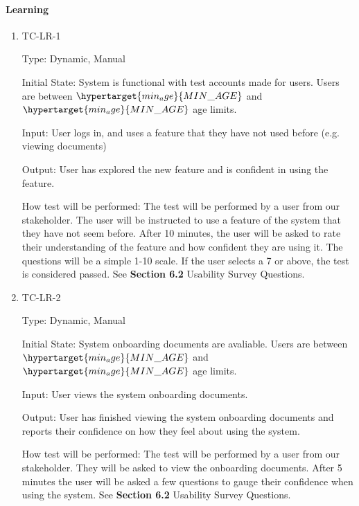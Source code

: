 \documentclass[12pt, titlepage]{article}
\begin{document}
\paragraph{Learning}
\begin{enumerate}
  \item{TC-LR-1\\}

    Type: Dynamic, Manual

    Initial State: System is functional with test accounts made for users. Users
    are between $\hypertarget{min_age}{MIN\_AGE}$ and
    $\hypertarget{min_age}{MIN\_AGE}$ age limits.

    Input: User logs in, and uses a feature that they have not used
    before (e.g. viewing documents)

    Output: User has explored the new feature and is confident in using the
    feature.

    How test will be performed: The test will be performed by a user from our
    stakeholder. The user will be instructed to use a feature of the system that
    they have not seem before. After 10 minutes, the user will be asked to rate
    their understanding of the feature and how confident they are using it. The
    questions will be a simple 1-10 scale. If the user selects a 7 or above, the
    test is considered passed. See \textbf{Section 6.2} Usability
    Survey Questions.

  \item{TC-LR-2\\}

    Type: Dynamic, Manual

    Initial State: System onboarding documents are avaliable. Users
    are between $\hypertarget{min_age}{MIN\_AGE}$ and
    $\hypertarget{min_age}{MIN\_AGE}$ age limits.

    Input: User views the system onboarding documents.

    Output: User has finished viewing the system onboarding documents and
    reports their confidence on how they feel about using the system.

    How test will be performed: The test will be performed by a user from our
    stakeholder. They will be asked to view the onboarding documents. After 5
    minutes the user will be asked a few questions to gauge their
    confidence when using the
    system. See \textbf{Section 6.2} Usability Survey Questions.

\end{enumerate}
\end{document}
